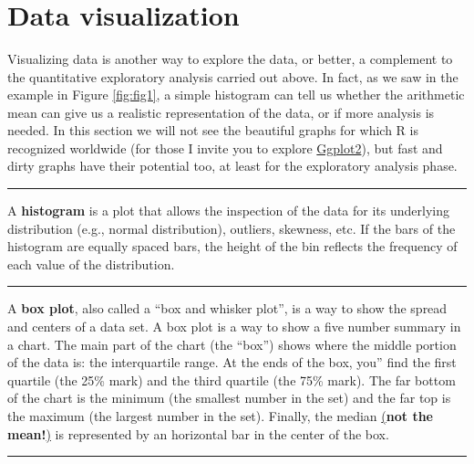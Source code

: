 \documentclass[
]{svmono}
\begin{document}
~

~

~

\hypertarget{data-visualization}{%
\section{Data visualization}\label{data-visualization}}

Visualizing data is another way to explore the data, or better, a
complement to the quantitative exploratory analysis carried out above.
In fact, as we saw in the example in Figure \ref{fig:fig1}, a simple histogram can
tell us whether the arithmetic mean can give us a realistic
representation of the data, or if more analysis is needed. In this
section we will not see the beautiful graphs for which R is recognized
worldwide (for those I invite you to explore \protect\hyperlink{ggplot2}{Ggplot2}), but fast and
dirty graphs have their potential too, at least for the exploratory
analysis phase.

\begin{center}\rule{0.5\linewidth}{0.5pt}\end{center}

A \textbf{histogram} is a plot that allows the inspection of the data for its
underlying distribution (e.g., normal distribution), outliers, skewness,
etc. If the bars of the histogram are equally spaced bars, the height of
the bin reflects the frequency of each value of the distribution.

\begin{center}\rule{0.5\linewidth}{0.5pt}\end{center}

A \textbf{box plot}, also called a ``box and whisker plot'', is a way to show
the spread and centers of a data set. A box plot is a way to show a five
number summary in a chart. The main part of the chart (the ``box'') shows
where the middle portion of the data is: the interquartile range. At the
ends of the box, you'' find the first quartile (the 25\% mark) and the
third quartile (the 75\% mark). The far bottom of the chart is the
minimum (the smallest number in the set) and the far top is the maximum
(the largest number in the set). Finally, the median
\ul{(}\textbf{not the mean!}\ul{)} is represented by an
horizontal bar in the center of the box.

\begin{center}\rule{0.5\linewidth}{0.5pt}\end{center}
\end{document}
